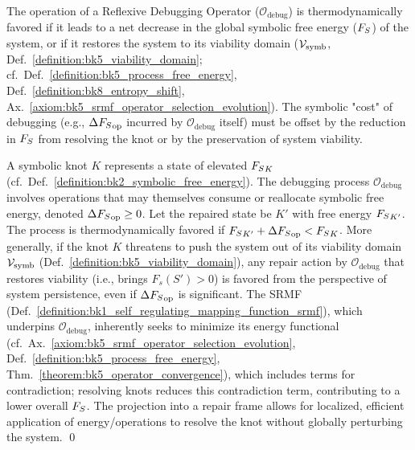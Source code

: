 \begin{theorem}
\label{theorem:bk8_observer_projection_tensor}
The operation of a Reflexive Debugging Operator ($\mathcal{O}_{\text{debug}}$) is thermodynamically favored if it leads to a net decrease in the global symbolic free energy ($F_S$) of the system, or if it restores the system to its viability domain ($\mathcal{V}_{\mathrm{symb}}$, Def.~\ref{definition:bk5_viability_domain}; cf.~Def.~\ref{definition:bk5_process_free_energy}, Def.~\ref{definition:bk8_entropy_shift}, Ax.~\ref{axiom:bk5_srmf_operator_selection_evolution}). The symbolic "cost" of debugging (e.g., $\Delta {F_S}_{\text{op}}$ incurred by $\mathcal{O}_{\text{debug}}$ itself) must be offset by the reduction in $F_S$ from resolving the knot or by the preservation of system viability.
\end{theorem}
\begin{demonstratio}
\label{demonstratio:bk8_symbolic_unkotting}
A symbolic knot $K$ represents a state of elevated ${F_S}_K$ (cf.~Def.~\ref{definition:bk2_symbolic_free_energy}). The debugging process $\mathcal{O}_{\text{debug}}$ involves operations that may themselves consume or reallocate symbolic free energy, denoted $\Delta {F_S}_{\text{op}} \ge 0$. Let the repaired state be $K'$ with free energy ${F_S}_{K'}$. The process is thermodynamically favored if ${F_S}_{K'} + \Delta {F_S}_{\text{op}} < {F_S}_K$.
More generally, if the knot $K$ threatens to push the system out of its viability domain $\mathcal{V}_{\mathrm{symb}}$ (Def.~\ref{definition:bk5_viability_domain}), any repair action by $\mathcal{O}_{\text{debug}}$ that restores viability (i.e., brings $F_s(S') > 0$) is favored from the perspective of system persistence, even if $\Delta {F_S}_{\text{op}}$ is significant.
The SRMF (Def.~\ref{definition:bk1_self_regulating_mapping_function_srmf}), which underpins $\mathcal{O}_{\text{debug}}$, inherently seeks to minimize its energy functional (cf.~Ax.~\ref{axiom:bk5_srmf_operator_selection_evolution}, Def.~\ref{definition:bk5_process_free_energy}, Thm.~\ref{theorem:bk5_operator_convergence}), which includes terms for contradiction; resolving knots reduces this contradiction term, contributing to a lower overall ${F_S}$. The projection into a repair frame allows for localized, efficient application of energy/operations to resolve the knot without globally perturbing the system. \qed
\end{demonstratio}

